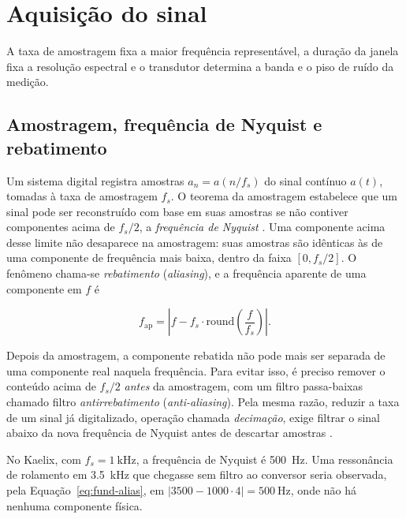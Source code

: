 \section{Aquisição do sinal}
\label{sec:fund-sinais}

A taxa de amostragem fixa a maior frequência representável, a duração da janela fixa a resolução espectral e o
transdutor determina a banda e o piso de ruído da medição.

\subsection{Amostragem, frequência de Nyquist e rebatimento}
\label{sec:fund-amostragem}

Um sistema digital registra amostras $a_n = a(n/f_s)$ do sinal contínuo $a(t)$, tomadas à taxa de amostragem
$f_s$. O teorema da amostragem estabelece que um sinal pode ser reconstruído com base em suas amostras se não
contiver componentes acima de $f_s/2$, a \emph{frequência de Nyquist} \cite{brandt2011}. Uma componente acima
desse limite não desaparece na amostragem: suas amostras são idênticas às de uma componente de frequência mais
baixa, dentro da faixa $[0, f_s/2]$. O fenômeno chama-se \emph{rebatimento} (\emph{aliasing}), e a frequência
aparente de uma componente em $f$ é

\begin{equation}
f_{\mathrm{ap}} = \left| f - f_s \cdot \mathrm{round}\!\left(\frac{f}{f_s}\right) \right|.
\label{eq:fund-alias}
\end{equation}

Depois da amostragem, a componente rebatida não pode mais ser separada de uma componente real naquela frequência.
Para evitar isso, é preciso remover o conteúdo acima de $f_s/2$ \emph{antes} da amostragem, com um filtro
passa-baixas chamado filtro \emph{antirrebatimento} (\emph{anti-aliasing}). Pela mesma razão, reduzir a taxa de um
sinal já digitalizado, operação chamada \emph{decimação}, exige filtrar o sinal abaixo da nova frequência de Nyquist
antes de descartar amostras \cite{brandt2011}.

No Kaelix, com $f_s = \SI{1}{\kilo\hertz}$, a frequência de Nyquist é \SI{500}{\hertz}. Uma ressonância de rolamento
em \SI{3,5}{\kilo\hertz} que chegasse sem filtro ao conversor seria observada, pela Equação~\eqref{eq:fund-alias}, em
$|3500 - 1000 \cdot 4| = \SI{500}{\hertz}$, onde não há nenhuma componente física.

